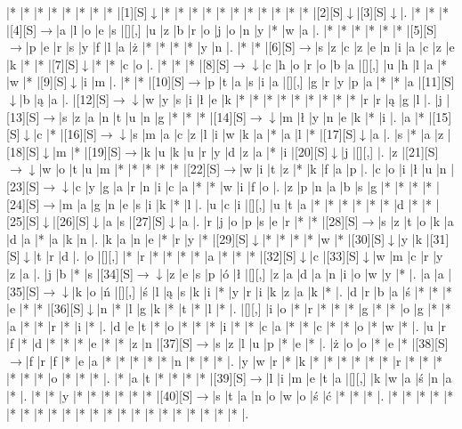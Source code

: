 \documentclass[11pt]{article}
\newcommand\drarr{$\rightarrow \!\!\!\!\! \downarrow$}
\newcommand\rarr{$\rightarrow$}
\newcommand\darr{$\downarrow$}
\begin{document}
\noindent\begin{Puzzle}{21}{27}|*	|*	|*	|*	|*	|*	|*	|*	|[1][S]\darr	|*	|*	|*	|*	|*	|*	|*	|*	|*	|*	|*	|[2][S]\darr	|[3][S]\darr	|.
|*	|*	|*	|[4][S]\rarr	|a	|l	|o	|e	|s	|[][,]{ }	|u	|z	|b	|r	|o	|j	|o	|n	|y	|*	|w	|a	|.
|*	|*	|*	|*	|*	|*	|[5][S]\rarr	|p	|e	|r	|s	|y	|f	|l	|a	|ż	|*	|*	|*	|*	|y	|n	|.
|*	|*	|[6][S]\rarr	|s	|z	|c	|z	|e	|n	|i	|a	|c	|z	|e	|k	|*	|*	|[7][S]\darr	|*	|*	|c	|o	|.
|*	|*	|*	|[8][S]\drarr	|c	|h	|o	|r	|o	|b	|a	|[][,]{ }	|u	|h	|l	|a	|*	|w	|*	|[9][S]\darr	|i	|m	|.
|*	|*	|[10][S]\rarr	|p	|t	|a	|s	|i	|a	|[][,]{ }	|g	|r	|y	|p	|a	|*	|*	|a	|[11][S]\darr	|b	|ą	|a	|.
|[12][S]\drarr	|w	|y	|s	|i	|ł	|e	|k	|*	|*	|*	|*	|*	|*	|*	|*	|*	|r	|r	|ą	|g	|l	|.
|j	|[13][S]\rarr	|s	|z	|a	|n	|t	|u	|n	|g	|*	|*	|*	|[14][S]\drarr	|m	|ł	|y	|n	|e	|k	|*	|i	|.
|a	|*	|[15][S]\darr	|c	|*	|[16][S]\drarr	|s	|m	|a	|c	|z	|l	|i	|w	|k	|a	|*	|a	|l	|*	|[17][S]\darr	|a	|.
|s	|*	|a	|z	|[18][S]\darr	|m	|*	|[19][S]\rarr	|k	|u	|k	|u	|r	|y	|d	|z	|a	|*	|i	|[20][S]\darr	|j	|[][,]{ }	|.
|z	|[21][S]\drarr	|w	|o	|t	|u	|m	|*	|*	|*	|*	|*	|[22][S]\rarr	|w	|i	|t	|z	|*	|k	|f	|a	|p	|.
|c	|o	|i	|ł	|u	|n	|[23][S]\drarr	|c	|y	|g	|a	|r	|n	|i	|c	|a	|*	|*	|w	|i	|f	|o	|.
|z	|p	|n	|a	|b	|s	|g	|*	|*	|*	|*	|[24][S]\rarr	|m	|a	|g	|n	|e	|s	|i	|k	|*	|l	|.
|u	|c	|i	|[][,]{ }	|u	|t	|a	|*	|*	|*	|*	|*	|*	|d	|*	|*	|[25][S]\darr	|[26][S]\darr	|a	|s	|[27][S]\darr	|a	|.
|r	|j	|o	|p	|s	|e	|r	|*	|*	|[28][S]\rarr	|s	|z	|t	|o	|k	|a	|d	|a	|*	|a	|k	|n	|.
|k	|a	|n	|e	|*	|r	|y	|*	|[29][S]\darr	|*	|*	|*	|*	|w	|*	|[30][S]\darr	|y	|k	|[31][S]\darr	|t	|r	|d	|.
|o	|[][,]{ }	|*	|r	|*	|*	|*	|*	|a	|*	|*	|*	|[32][S]\darr	|c	|[33][S]\darr	|w	|m	|c	|r	|y	|z	|a	|.
|j	|b	|*	|s	|[34][S]\drarr	|z	|e	|s	|p	|ó	|ł	|[][,]{ }	|z	|a	|d	|a	|n	|i	|o	|w	|y	|*	|.
|a	|a	|[35][S]\drarr	|k	|o	|ń	|[][,]{ }	|ś	|l	|ą	|s	|k	|i	|*	|y	|r	|i	|k	|z	|a	|k	|*	|.
|d	|r	|b	|a	|ś	|*	|*	|*	|e	|*	|*	|[36][S]\darr	|n	|*	|l	|g	|k	|*	|t	|*	|l	|*	|.
|[][,]{ }	|i	|o	|*	|r	|*	|*	|*	|g	|*	|*	|o	|g	|*	|*	|a	|*	|*	|r	|*	|i	|*	|.
|d	|e	|t	|*	|o	|*	|*	|*	|i	|*	|*	|c	|a	|*	|*	|c	|*	|*	|o	|*	|w	|*	|.
|u	|r	|f	|*	|d	|*	|*	|*	|e	|*	|*	|z	|n	|[37][S]\rarr	|s	|z	|l	|u	|p	|*	|e	|*	|.
|ż	|o	|o	|*	|e	|*	|[38][S]\rarr	|f	|r	|f	|*	|e	|a	|*	|*	|*	|*	|*	|n	|*	|*	|*	|.
|y	|w	|r	|*	|k	|*	|*	|*	|*	|*	|*	|r	|*	|*	|*	|*	|*	|*	|o	|*	|*	|*	|.
|*	|a	|t	|*	|*	|*	|*	|[39][S]\rarr	|l	|i	|m	|e	|t	|a	|[][,]{ }	|k	|w	|a	|ś	|n	|a	|*	|.
|*	|*	|y	|*	|*	|*	|*	|*	|*	|[40][S]\rarr	|s	|t	|a	|n	|o	|w	|o	|ś	|ć	|*	|*	|*	|.
|*	|*	|*	|*	|*	|*	|*	|*	|*	|*	|*	|*	|*	|*	|*	|*	|*	|*	|*	|*	|*	|*	|.\end{Puzzle}
\end{document}
